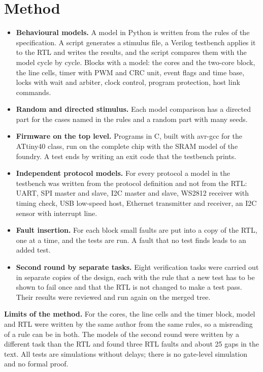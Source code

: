 \documentclass[10pt,a4paper]{article}
\begin{document}
\section{Method}

\begin{itemize}
\item \textbf{Behavioural models.} A model in Python is written from the rules of the specification. A script
generates a stimulus file, a Verilog testbench applies it to the RTL and writes the results, and the script
compares them with the model cycle by cycle. Blocks with a model: the cores and the two-core block, the line
cells, timer with PWM and CRC unit, event flags and time base, locks with wait and arbiter, clock control,
program protection, host link commands.
\item \textbf{Random and directed stimulus.} Each model comparison has a directed part for the cases named in the
rules and a random part with many seeds.
\item \textbf{Firmware on the top level.} Programs in C, built with avr-gcc for the ATtiny40 class, run on the
complete chip with the SRAM model of the foundry. A test ends by writing an exit code that the testbench
prints.
\item \textbf{Independent protocol models.} For every protocol a model in the testbench was written from the
protocol definition and not from the RTL: UART, SPI master and slave, I2C master and slave, WS2812 receiver
with timing check, USB low-speed host, Ethernet transmitter and receiver, an I2C sensor with interrupt line.
\item \textbf{Fault insertion.} For each block small faults are put into a copy of the RTL, one at a time, and the
tests are run. A fault that no test finds leads to an added test.
\item \textbf{Second round by separate tasks.} Eight verification tasks were carried out in separate copies of the
design, each with the rule that a new test has to be shown to fail once and that the RTL is not changed to make
a test pass. Their results were reviewed and run again on the merged tree.
\end{itemize}

\textbf{Limits of the method.} For the cores, the line cells and the timer block, model and RTL were written by
the same author from the same rules, so a misreading of a rule can be in both. The models of the second round
were written by a different task than the RTL and found three RTL faults and about 25 gaps in the text. All
tests are simulations without delays; there is no gate-level simulation and no formal proof.
\end{document}
